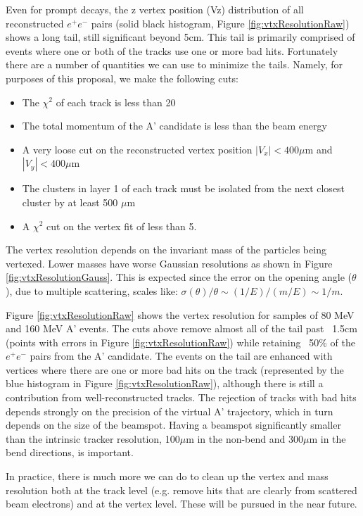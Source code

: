 Even for prompt decays, the z vertex position (Vz) distribution of all reconstructed $e^+e^-$ pairs
  (solid black histogram, Figure \ref{fig:vtxResolutionRaw}) shows a long tail, still significant beyond 5cm.   
This tail is primarily comprised of events where one or both of the tracks use one or 
more bad hits.  Fortunately there are a number of quantities we can use to minimize the tails.  
Namely, for purposes of this proposal, we make the following cuts:

\begin{itemize}
\item The $\chi^2$  of each track is less than 20
\item The total momentum of the A' candidate is less than the beam energy
\item A very loose cut on the reconstructed vertex position $|V_x|<400\mu$m and $|V_y|<400\mu$m
\item The clusters in layer 1 of each track must be isolated from the next closest cluster by at least 500 $\mu$m 
\item A $\chi^2$ cut on the vertex fit of less than 5.
\end{itemize}

The vertex resolution depends on the invariant mass of the particles being vertexed. 
Lower masses have worse Gaussian resolutions as shown in Figure \ref{fig:vtxResolutionGauss}.  This is expected 
since the error on the opening angle ($\theta$), due to multiple scattering, scales like: 
 $\sigma (\theta )/\theta \sim (1/E)/(m/E) \sim 1/m$.
 
Figure \ref{fig:vtxResolutionRaw} shows the vertex resolution for samples of 80 MeV and 160 MeV A' events. 
The cuts above remove almost all of the tail past ~1.5cm (points with errors in Figure \ref{fig:vtxResolutionRaw}) 
while retaining ~50\% of the $e^+e^-$ pairs from the A' candidate. The events on the tail are 
enhanced with vertices where there are one or more bad hits on the track (represented by the 
blue histogram in Figure \ref{fig:vtxResolutionRaw}), although there is still a contribution from well-reconstructed 
tracks.  The rejection of tracks with bad hits depends strongly on the precision of the virtual A' 
trajectory, which in turn depends on the size of the beamspot. Having a beamspot significantly 
smaller than the intrinsic tracker resolution, 100$\mu$m in the non-bend and 300$\mu$m in 
the bend directions, is important.  

In practice, there is much more we can do to clean up the vertex and mass resolution both at 
the track level (e.g. remove hits that are clearly from scattered beam electrons) and at 
the vertex level.  These will be pursued in the near future.

